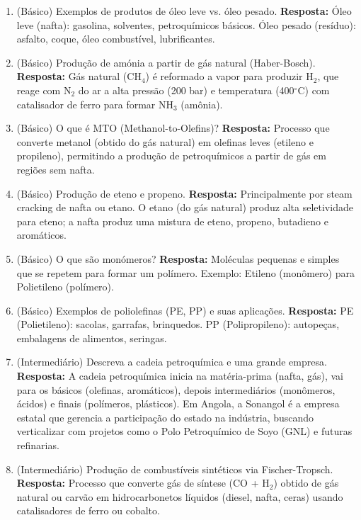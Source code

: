 \documentclass[11pt,a4paper]{article}
\begin{document}
\begin{enumerate}
  \item (Básico) Exemplos de produtos de óleo leve vs. óleo pesado.
  \textbf{Resposta:} Óleo leve (nafta): gasolina, solventes, petroquímicos básicos. Óleo pesado (resíduo): asfalto, coque, óleo combustível, lubrificantes.

  \item (Básico) Produção de amónia a partir de gás natural (Haber-Bosch).
  \textbf{Resposta:} Gás natural (CH$_4$) é reformado a vapor para produzir H$_2$, que reage com N$_2$ do ar a alta pressão (200 bar) e temperatura (400$^\circ$C) com catalisador de ferro para formar NH$_3$ (amônia).

  \item (Básico) O que é MTO (Methanol-to-Olefins)?
  \textbf{Resposta:} Processo que converte metanol (obtido do gás natural) em olefinas leves (etileno e propileno), permitindo a produção de petroquímicos a partir de gás em regiões sem nafta.

  \item (Básico) Produção de eteno e propeno.
  \textbf{Resposta:} Principalmente por steam cracking de nafta ou etano. O etano (do gás natural) produz alta seletividade para eteno; a nafta produz uma mistura de eteno, propeno, butadieno e aromáticos.

  \item (Básico) O que são monómeros?
  \textbf{Resposta:} Moléculas pequenas e simples que se repetem para formar um polímero. Exemplo: Etileno (monômero) para Polietileno (polímero).

  \item (Básico) Exemplos de poliolefinas (PE, PP) e suas aplicações.
  \textbf{Resposta:} PE (Polietileno): sacolas, garrafas, brinquedos. PP (Polipropileno): autopeças, embalagens de alimentos, seringas.

  \item (Intermediário) Descreva a cadeia petroquímica e uma grande empresa.
  \textbf{Resposta:} A cadeia petroquímica inicia na matéria-prima (nafta, gás), vai para os básicos (olefinas, aromáticos), depois intermediários (monômeros, ácidos) e finais (polímeros, plásticos). Em Angola, a Sonangol é a empresa estatal que gerencia a participação do estado na indústria, buscando verticalizar com projetos como o Polo Petroquímico de Soyo (GNL) e futuras refinarias.

  \item (Intermediário) Produção de combustíveis sintéticos via Fischer-Tropsch.
  \textbf{Resposta:} Processo que converte gás de síntese (CO + H$_2$) obtido de gás natural ou carvão em hidrocarbonetos líquidos (diesel, nafta, ceras) usando catalisadores de ferro ou cobalto.


\end{enumerate}
\end{document}
